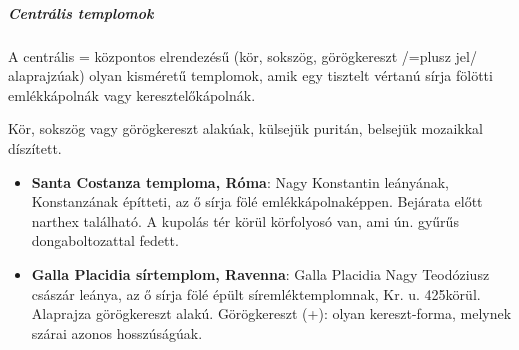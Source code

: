 		\begin{figure}[H]
			\centering
			\begin{minipage}{0.4\textwidth}
			\end{minipage}
			\hfill
			\begin{minipage}{0.55\textwidth}
				
			\end{minipage}
		\end{figure}
		
		\subparagraph{Centrális templomok}
		A centrális = központos elrendezésű (kör, sokszög, görögkereszt /=plusz jel/ alaprajzúak) olyan kisméretű templomok, amik egy tisztelt vértanú sírja fölötti emlékkápolnák vagy keresztelőkápolnák.
		
		Kör, sokszög vagy görögkereszt alakúak, külsejük puritán, belsejük mozaikkal díszített.
		\begin{itemize}
			\item \textbf{Santa Costanza temploma, Róma}: Nagy Konstantin leányának, Konstanzának építteti, az ő sírja fölé emlékkápolnaképpen. Bejárata előtt narthex található. A kupolás tér körül körfolyosó van, ami ún. gyűrűs dongaboltozattal fedett.
		\end{itemize}
		
		 \begin{center}
		 \end{center}
		
	
		\begin{itemize}
			\item\textbf{Galla Placidia sírtemplom, Ravenna}: Galla Placidia Nagy Teodóziusz császár leánya, az ő sírja fölé épült síremléktemplomnak, Kr. u. 425körül. Alaprajza görögkereszt alakú. Görögkereszt (+): olyan kereszt-forma, melynek szárai azonos hosszúságúak.
		\end{itemize}
	
